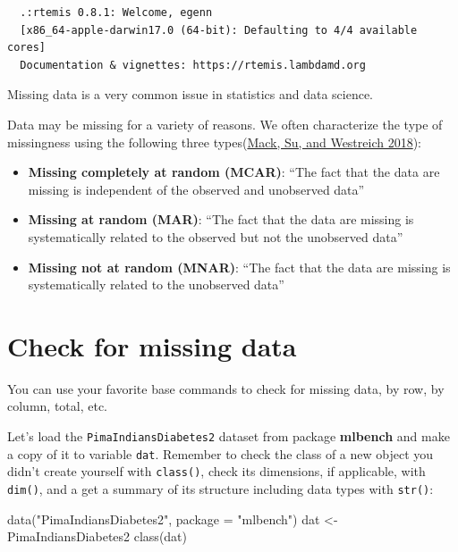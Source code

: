 \documentclass[
]{book}
\newenvironment{Shaded}{\begin{snugshade}}{\end{snugshade}}
\newcommand{\AttributeTok}[1]{\textcolor[rgb]{0.77,0.63,0.00}{#1}}
\newcommand{\FunctionTok}[1]{\textcolor[rgb]{0.00,0.00,0.00}{#1}}
\newcommand{\NormalTok}[1]{#1}
\newcommand{\OtherTok}[1]{\textcolor[rgb]{0.56,0.35,0.01}{#1}}
\newcommand{\StringTok}[1]{\textcolor[rgb]{0.31,0.60,0.02}{#1}}
\providecommand{\tightlist}{%
  \setlength{\itemsep}{0pt}\setlength{\parskip}{0pt}}
\begin{document}
\begin{verbatim}
  .:rtemis 0.8.1: Welcome, egenn
  [x86_64-apple-darwin17.0 (64-bit): Defaulting to 4/4 available cores]
  Documentation & vignettes: https://rtemis.lambdamd.org
\end{verbatim}

Missing data is a very common issue in statistics and data science.

Data may be missing for a variety of reasons. We often characterize the type of missingness using the following three types(\protect\hyperlink{ref-mack2018managing}{Mack, Su, and Westreich 2018}):

\begin{itemize}
\tightlist
\item
  \textbf{Missing completely at random (MCAR)}:
  ``The fact that the data are missing is independent of the observed and unobserved data''
\item
  \textbf{Missing at random (MAR)}:
  ``The fact that the data are missing is systematically related to the observed but not the unobserved data''
\item
  \textbf{Missing not at random (MNAR)}:
  ``The fact that the data are missing is systematically related to the unobserved data''
\end{itemize}

\hypertarget{check-for-missing-data}{%
\section{Check for missing data}\label{check-for-missing-data}}

You can use your favorite base commands to check for missing data, by row, by column, total, etc.

Let's load the \texttt{PimaIndiansDiabetes2} dataset from package \textbf{mlbench} and make a copy of it to variable \texttt{dat}. Remember to check the class of a new object you didn't create yourself with \texttt{class()}, check its dimensions, if applicable, with \texttt{dim()}, and a get a summary of its structure including data types with \texttt{str()}:

\begin{Shaded}
\begin{Highlighting}[]
\FunctionTok{data}\NormalTok{(}\StringTok{"PimaIndiansDiabetes2"}\NormalTok{, }\AttributeTok{package =} \StringTok{"mlbench"}\NormalTok{)}
\NormalTok{dat }\OtherTok{\textless{}{-}}\NormalTok{ PimaIndiansDiabetes2}
\FunctionTok{class}\NormalTok{(dat)}
\end{Highlighting}
\end{Shaded}
\end{document}
